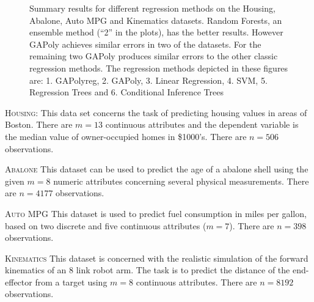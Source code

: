 \documentclass[preprint,authoryear,12pt]{elsarticle}
\begin{document}
\begin{description}
\begin{figure}[tb]
\begin{center}
\caption{Summary results for different regression methods on the Housing, Abalone, Auto MPG and Kinematics datasets. Random Forests, an ensemble method (``2'' in the plots), has the better results. However \ac{GAPoly} achieves similar errors in two of the datasets. For the remaining two \ac{GAPoly} produces similar errors to the other classic regression methods.  The regression methods depicted in these figures are: 1. \ac{GAPolyreg}, 2. \ac{GAPoly}, 3. Linear Regression, 4. SVM, 5. Regression Trees and 6. Conditional Inference Trees}
\label{Housing_dataset_lambda0.8_25runs}
\label{Abalone_dataset_lambda0.8_25runs}
\label{Auto-Mpg_dataset_lambda0.8_25runs}
\label{Kinematics300_lambda0.8_25runs}
\end{center}\end{figure}

\item{\textsc{Housing}}: This data set concerns the task of predicting housing values in areas of Boston. There are $m=13$ continuous attributes and the dependent variable is the median value of owner-occupied homes in \$1000's. There are $n=506$ observations.


\item{\textsc{Abalone}} This dataset can be used to predict the age of a abalone shell using the given $m=8$ numeric attributes concerning several physical measurements. There are $n=4177$ observations. 


\item{\textsc{Auto MPG}} This dataset is used to predict fuel consumption in miles per gallon, based on two discrete and five continuous attributes ($m=7$). There are $n=398$ observations.


\item{\textsc{Kinematics}} This dataset is concerned with the realistic simulation of the forward kinematics of an 8 link robot arm. The task is to predict the distance of the end-effector from a target using $m=8$ continuous attributes. There are $n=8192$ observations. 


\end{description}
\end{document}
